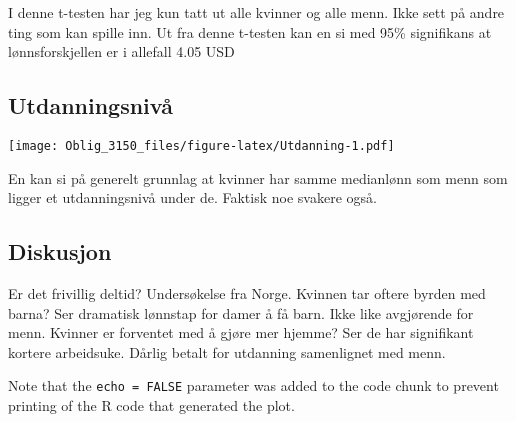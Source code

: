 \documentclass[]{article}
\begin{document}
I denne t-testen har jeg kun tatt ut alle kvinner og alle menn. Ikke
sett på andre ting som kan spille inn. Ut fra denne t-testen kan en si
med 95\% signifikans at lønnsforskjellen er i allefall 4.05 USD

\subsection{Utdanningsnivå}\label{utdanningsniva}

\texttt{[image: Oblig\_3150\_files/figure-latex/Utdanning-1.pdf]}

En kan si på generelt grunnlag at kvinner har samme medianlønn som menn
som ligger et utdanningsnivå under de. Faktisk noe svakere også.

\subsection{Diskusjon}\label{diskusjon}

Er det frivillig deltid? Undersøkelse fra Norge. Kvinnen tar oftere
byrden med barna? Ser dramatisk lønnstap for damer å få barn. Ikke like
avgjørende for menn. Kvinner er forventet med å gjøre mer hjemme? Ser de
har signifikant kortere arbeidsuke. Dårlig betalt for utdanning
samenlignet med menn.

Note that the \texttt{echo\ =\ FALSE} parameter was added to the code
chunk to prevent printing of the R code that generated the plot.
\end{document}
